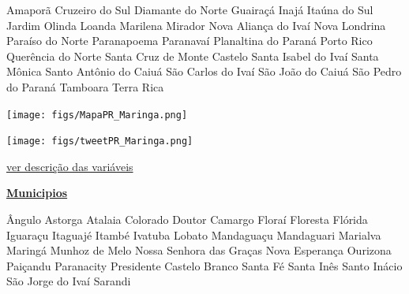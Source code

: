 \documentclass[10pt]{article} %
\begin{document}
\begin{minipage}[t]{.30\linewidth}
\begin{mdframed}[style=sidebar,frametitle={}]
\begin{itemize}
\gsquare Amaporã 
\gsquare Cruzeiro do Sul 
\gsquare Diamante do Norte 
\gsquare Guairaçá 
\gsquare Inajá 
\gsquare Itaúna do Sul 
\gsquare Jardim Olinda 
\gsquare Loanda 
\gsquare Marilena 
\gsquare Mirador 
\gsquare Nova Aliança do Ivaí 
\gsquare Nova Londrina 
\gsquare Paraíso do Norte 
\gsquare Paranapoema 
\gsquare Paranavaí 
\gsquare Planaltina do Paraná 
\gsquare Porto Rico 
\gsquare Querência do Norte 
\gsquare Santa Cruz de Monte Castelo 
\gsquare Santa Isabel do Ivaí 
\gsquare Santa Mônica 
\gsquare Santo Antônio do Caiuá 
\gsquare São Carlos do Ivaí 
\gsquare São João do Caiuá 
\gsquare São Pedro do Paraná 
\gsquare Tamboara 
\gsquare Terra Rica 
\end{itemize}\BackToContents\end{mdframed}\hfill\end{minipage}\newpage\begin{minipage}[t]{.66\linewidth}
\hypertarget{Mrng}{}
\texttt{[image: figs/MapaPR\_Maringa.png]}\vspace{0.5cm}\vspace{0.5cm}\begin{center}
\texttt{[image: figs/tweetPR\_Maringa.png]}\end{center}
\begin{center}

\end{center}
\small{\hyperlink{vartab}{ver descrição das variáveis}}\end{minipage}\hfill\begin{minipage}[t]{.30\linewidth}
\begin{mdframed}[style=sidebar,frametitle={}]
\textbf{\hyperlink{municips}{Municipios}}\begin{itemize}\gsquare Ângulo 
\gsquare Astorga 
\gsquare Atalaia 
\gsquare Colorado 
\gsquare Doutor Camargo 
\gsquare Floraí 
\gsquare Floresta 
\gsquare Flórida 
\gsquare Iguaraçu 
\gsquare Itaguajé 
\gsquare Itambé 
\gsquare Ivatuba 
\gsquare Lobato 
\gsquare Mandaguaçu 
\gsquare Mandaguari 
\gsquare Marialva 
\gsquare Maringá 
\gsquare Munhoz de Melo 
\gsquare Nossa Senhora das Graças 
\gsquare Nova Esperança 
\gsquare Ourizona 
\gsquare Paiçandu 
\gsquare Paranacity 
\gsquare Presidente Castelo Branco 
\gsquare Santa Fé 
\gsquare Santa Inês 
\gsquare Santo Inácio 
\gsquare São Jorge do Ivaí 
\gsquare Sarandi 

\end{itemize}
\end{mdframed}
\end{minipage}
\end{document}
